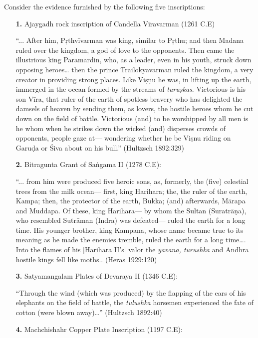 Consider the evidence furnished by the following five inscriptions: 
\begin{itemize}
\itemsep=0pt
\item[{\bf 1.}] Ajaygadh rock inscription of Candella Vīravarman (1261 C.E) 

“... After him, Pṛthvīvarman was king, similar to Pṛthu; and then Madana ruled over the kingdom, a god of love to the opponents. Then came the illustrious king Paramardin, who, as a leader, even in his youth, struck down opposing heroes… then the prince Trailokyavarman ruled the kingdom, a very creator in providing strong places. Like Viṣṇu he was, in lifting up the earth, immerged in the ocean formed by the streams of {\sl turuṣkas}. Victorious is his son Vīra, that ruler of the earth of spotless bravery who has delighted the damsels of heaven by sending them, as lovers, the hostile heroes whom he cut down on the field of battle. Victorious (and) to be worshipped by all men is he whom when he strikes down the wicked (and) disperses crowds of opponents, people gaze at— wondering whether he be Viṣnu riding on Garuḍa or Śiva about on his bull.” 
\hfill (Hultzsch 1892:329)

\item[{\bf 2.}] Bitragunta Grant of Saṅgama II (1278 C.E): 

“... from him were produced five heroic sons, as, formerly, the (five) celestial trees from the milk ocean— first, king Harihara; the, the ruler of the earth, Kampa; then, the protector of the earth, Bukka; (and) afterwards, Mārapa and Muddapa. Of these, king Harihara— by whom the Sultan (Suratrāṇa), who resembled Sutrāman (Indra) was defeated— ruled the earth for a long time. His younger brother, king Kampana, whose name became true to its meaning as he made the enemies tremble, ruled the earth for a long time…. Into the flames of his [Harihara II’s] valor the {\sl yavana, turushka} and Andhra hostile kings fell like moths.. (Heras 1929:120) 

\item[{\bf 3.}] Satyamangalam Plates of Devaraya II (1346 C.E): 

“Through the wind (which was produced) by the flapping of the ears of his elephants on the field of battle, the {\sl tulushka} horsemen experienced the fate of cotton (were blown away)…” (Hultzsch 1892:40)

\item[{\bf 4.}] Machchishahr Copper Plate Inscription (1197 C.E): 


\end{itemize}
